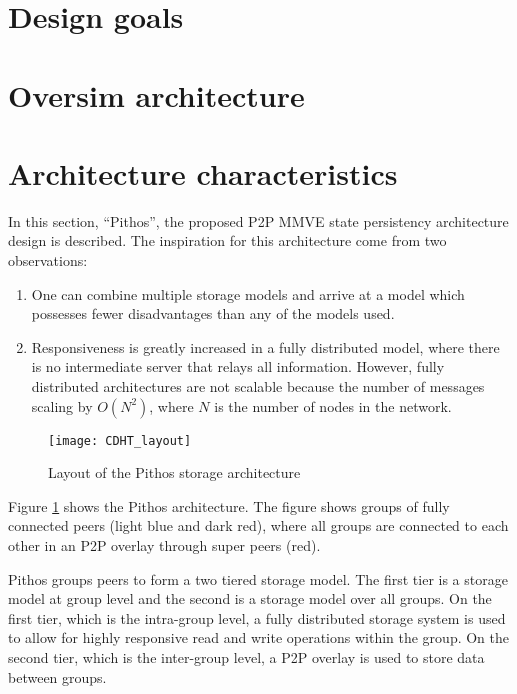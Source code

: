     \section{Design goals}

    \section{Oversim architecture}

    \section{Architecture characteristics}

In this section, ``Pithos'', the proposed P2P MMVE state persistency architecture design is described. The inspiration for this architecture come
from two observations:
%
\begin{enumerate}
  \item One can combine multiple storage models and arrive at a model which possesses fewer disadvantages than any of the models used.
  \item Responsiveness is greatly increased in a fully distributed model, where there is no intermediate server that relays all information.
      However, fully distributed architectures are not scalable because the number of messages scaling by $O(N^2)$, where $N$ is the number of
      nodes in the network.
\end{enumerate}

\begin{figure}[htbp]
 \centering
 \texttt{[image: CDHT\_layout]}
 \caption{Layout of the Pithos storage architecture}
 \label{fig_pithos}
\end{figure}
%
Figure \ref{fig_pithos} shows the Pithos architecture. The figure shows groups of fully connected peers (light blue and dark red), where all groups
are connected to each other in an P2P overlay through super peers (red).

Pithos groups peers to form a two tiered storage model. The first tier is a storage model at group level and the second is a storage model over all
groups. On the first tier, which is the intra-group level, a fully distributed storage system is used to allow for highly responsive read and write
operations within the group. On the second tier, which is the inter-group level, a P2P overlay is used to store data between groups.

